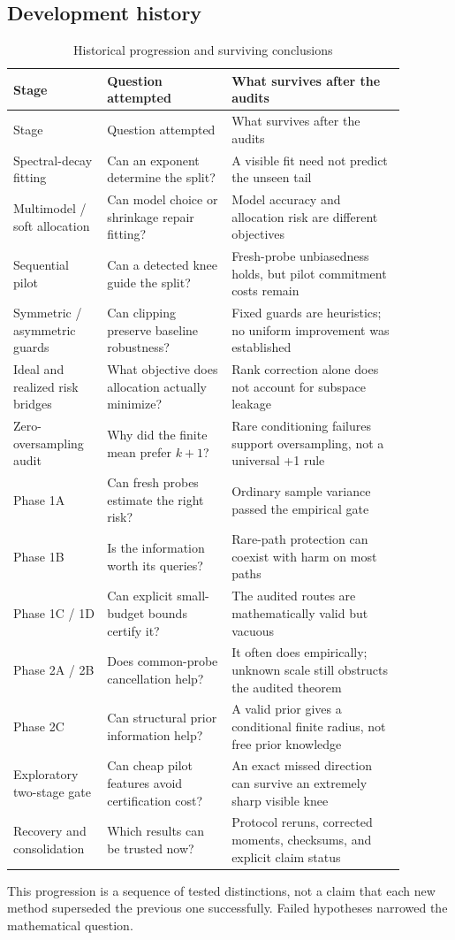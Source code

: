 \subsection{Development history}
{\small
\begin{longtable}{@{}>{\raggedright\arraybackslash}p{0.2024\linewidth}>{\raggedright\arraybackslash}p{0.2816\linewidth}>{\raggedright\arraybackslash}p{0.3960\linewidth}@{}}
\caption{Historical progression and surviving conclusions}\label{tab:auto6}\\
\toprule
Stage & Question attempted & What survives after the audits \\
\midrule
\endfirsthead
\toprule
Stage & Question attempted & What survives after the audits \\
\midrule
\endhead
Spectral-decay fitting & Can an exponent determine the split? & A visible fit need not predict the unseen tail \\
Multimodel / soft allocation & Can model choice or shrinkage repair fitting? & Model accuracy and allocation risk are different objectives \\
Sequential pilot & Can a detected knee guide the split? & Fresh-probe unbiasedness holds, but pilot commitment costs remain \\
Symmetric / asymmetric guards & Can clipping preserve baseline robustness? & Fixed guards are heuristics; no uniform improvement was established \\
Ideal and realized risk bridges & What objective does allocation actually minimize? & Rank correction alone does not account for subspace leakage \\
Zero-oversampling audit & Why did the finite mean prefer $k+1$? & Rare conditioning failures support oversampling, not a universal +1 rule \\
Phase 1A & Can fresh probes estimate the right risk? & Ordinary sample variance passed the empirical gate \\
Phase 1B & Is the information worth its queries? & Rare-path protection can coexist with harm on most paths \\
Phase 1C / 1D & Can explicit small-budget bounds certify it? & The audited routes are mathematically valid but vacuous \\
Phase 2A / 2B & Does common-probe cancellation help? & It often does empirically; unknown scale still obstructs the audited theorem \\
Phase 2C & Can structural prior information help? & A valid prior gives a conditional finite radius, not free prior knowledge \\
Exploratory two-stage gate & Can cheap pilot features avoid certification cost? & An exact missed direction can survive an extremely sharp visible knee \\
Recovery and consolidation & Which results can be trusted now? & Protocol reruns, corrected moments, checksums, and explicit claim status \\
\bottomrule
\end{longtable}
}
This progression is a sequence of tested distinctions, not a claim that each new method superseded the previous one successfully. Failed hypotheses narrowed the mathematical question.

